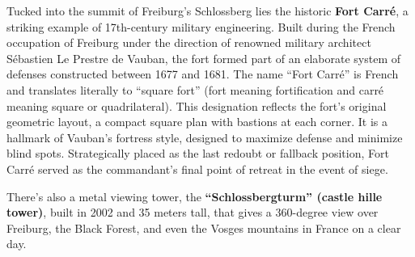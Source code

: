 \documentclass[landscape, a4paper]{article}
\newcommand\alert[1]{\textcolor{PrimaryColor}{\textbf{#1}}}
\begin{document}
\begin{minipage}[t]{0.31\textwidth}
{    Tucked into the summit of Freiburg’s Schlossberg lies the historic \alert{Fort Carré}, a striking example of 17th-century military engineering. Built during the French occupation of Freiburg under the direction of renowned military architect Sébastien Le Prestre de Vauban, the fort formed part of an elaborate system of defenses constructed between 1677 and 1681. The name \enquote{Fort Carré} is French and translates literally to \enquote{square fort} (fort meaning fortification and carré meaning square or quadrilateral). This designation reflects the fort’s original geometric layout, a compact square plan with bastions at each corner. It is a hallmark of Vauban’s fortress style, designed to maximize defense and minimize blind spots. Strategically placed as the last redoubt or fallback position, Fort Carré served as the commandant’s final point of retreat in the event of siege.

		There’s also a metal viewing tower, the \alert{\enquote{Schlossbergturm} (castle hille tower)}, built in 2002 and 35 meters tall, that gives a 360-degree view over Freiburg, the Black Forest, and even the Vosges mountains in France on a clear day.
%
	}{
	}
\end{minipage}%
\newpage
\end{document}
